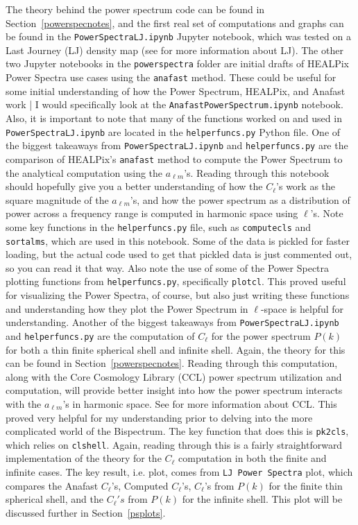 \documentclass[11pt]{article}
\renewcommand{\_}[1]{\underline{ #1 }}
\newcommand{\npar}{\vspace{.3cm}\newline}
\newcommand{\us}{\textunderscore}
\begin{document}
{The theory behind the power spectrum code can be found in Section~\ref{powerspecnotes}, and the first real set of computations and graphs can be found in the \texttt{Power\us Spectra\us LJ.ipynb} Jupyter notebook, which was tested on a Last Journey (LJ) density map (see \cite{Heitmann_2021} for more information about LJ). The other two Jupyter notebooks in the \texttt{power\us spectra} folder are initial drafts of HEALPix Power Spectra use cases using the \texttt{anafast} method. These could be useful for some initial understanding of how the Power Spectrum, HEALPix, and Anafast work | I would specifically look at the \texttt{Anafast\us Power\us Spectrum.ipynb} notebook. Also, it is important to note that many of the functions worked on and used in \texttt{Power\us Spectra\us LJ.ipynb} are located in the \texttt{helper\us funcs.py} Python file.
\npar
One of the biggest takeaways from \texttt{Power\us Spectra\us LJ.ipynb} and \texttt{helper\us funcs.py} are the comparison of HEALPix's \texttt{anafast} method to compute the Power Spectrum to the analytical computation using the $a_{\ell m}$'s. Reading through this notebook should hopefully give you a better understanding of how the $C_{\ell}$'s work as the square magnitude of the $a_{\ell m}$'s, and how the power spectrum as a distribution of power across a frequency range is computed in harmonic space using $\ell$'s. Note some key functions in the \texttt{helper\us funcs.py} file, such as \texttt{compute\us cls} and \texttt{sort\us alms}, which are used in this notebook. Some of the data is pickled for faster loading, but the actual code used to get that pickled data is just commented out, so you can read it that way. Also note the use of some of the Power Spectra plotting functions from \texttt{helper\us funcs.py}, specifically \texttt{plot\us cl}. This proved useful for visualizing the Power Spectra, of course, but also just writing these functions and understanding how they plot the Power Spectrum in $\ell$-space is helpful for understanding.
\npar
Another of the biggest takeaways from \texttt{Power\us Spectra\us LJ.ipynb} and \texttt{helper\us funcs.py} are the computation of $C_{\ell}$ for the power spectrum $P(k)$ for both a thin finite spherical shell and infinite shell. Again, the theory for this can be found in Section~\ref{powerspecnotes}. Reading through this computation, along with the Core Cosmology Library (CCL) power spectrum utilization and computation, will provide better insight into how the power spectrum interacts with the $a_{\ell m}$'s in harmonic space. See \cite{CCL} for more information about CCL. This proved very helpful for my understanding prior to delving into the more complicated world of the Bispectrum. The key function that does this is \texttt{pk2cls}, which relies on \texttt{\us cl\us shell}. Again, reading through this is a fairly straightforward implementation of the theory for the $C_{\ell}$ computation in both the finite and infinite cases. The key result, i.e. plot, comes from \texttt{LJ Power Spectra} plot, which compares the Anafast $C_{\ell}$'s, Computed $C_{\ell}$'s, $C_{\ell}$'s from $P(k)$ for the finite thin spherical shell, and the $C_{\ell}'s$ from $P(k)$ for the infinite shell. This plot will be discussed further in Section~\ref{psplots}.
}
\end{document}
